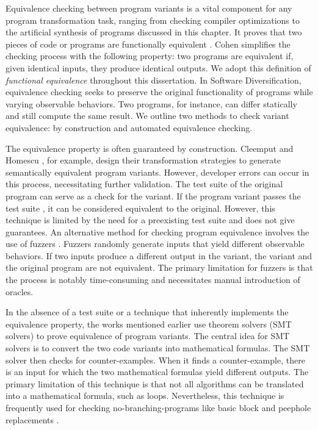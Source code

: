 Equivalence checking between program variants is a vital component for any program transformation task, ranging from checking compiler optimizations \cite{LeCompilers} to the artificial synthesis of programs discussed in this chapter. 
It proves that two pieces of code or programs are functionally equivalent \cite{churchill2019}. 
Cohen \cite{cohen1993operating} simplifies the checking process with the following property: two programs are equivalent if, given identical inputs, they produce identical outputs. 
We adopt this definition of \emph{functional equivalence} throughout this dissertation. 
In Software Diversification, equivalence checking seeks to preserve the original functionality of programs while varying observable behaviors. 
Two programs, for instance, can differ statically and still compute the same result. 
We outline two methods to check variant equivalence: by construction and automated equivalence checking.


\begin{checking}
    \label{check_by_construction}
    The equivalence property is often guaranteed by construction. 
    Cleemput \etal \cite{Cleemput2012} and Homescu \etal \cite{homescu2013profile}, for example, design their transformation strategies to generate semantically equivalent program variants. 
    However, developer errors can occur in this process, necessitating further validation. 
    The test suite of the original program can serve as a check for the variant. 
    If the program variant passes the test suite \cite{harrand2020java}, it can be considered equivalent to the original. 
    However, this technique is limited by the need for a preexisting test suite and does not give guarantees. 
    An alternative method for checking program equivalence involves the use of fuzzers \cite{zalewski2017american}.
    Fuzzers randomly generate inputs that yield different observable behaviors. 
    If two inputs produce a different output in the variant, the variant and the original program are not equivalent. 
    The primary limitation for fuzzers is that the process is notably time-consuming and necessitates manual introduction of oracles.
\end{checking}

\begin{checking}
    \label{check_by_smt}
    In the absence of a test suite or a technique that inherently implements the equivalence property, the works mentioned earlier use theorem solvers (SMT solvers) \cite{SMT_solver} to prove equivalence of program variants. 
    The central idea for SMT solvers is to convert the two code variants into mathematical formulas. 
    The SMT solver then checks for counter-examples. 
    When it finds a counter-example, there is an input for which the two mathematical formulas yield different outputs. 
    The primary limitation of this technique is that not all algorithms can be translated into a mathematical formula, such as loops. 
    Nevertheless, this technique is frequently used for checking no-branching-programs like basic block and peephole replacements \cite{SuperoptimizationScaling}.
\end{checking}




